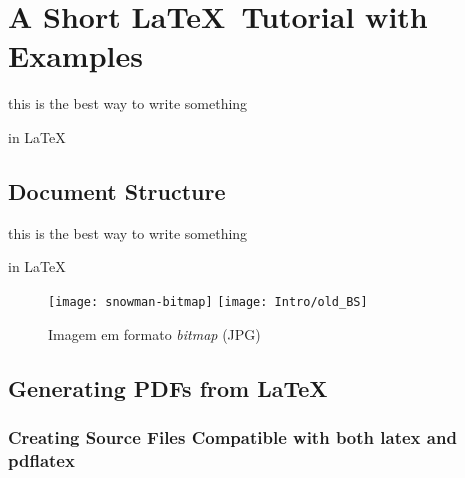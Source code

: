 

\chapter{A Short \LaTeX\ Tutorial with Examples}\label{cha:a_short_latex_tutorial_with_examples}

this is the best way
to write something

in LaTeX


\section{Document Structure}\label{sec:document_structure}

this is the best way
to write something

in LaTeX

\begin{figure}[htbp]
	\centering
	\texttt{[image: snowman-bitmap]}
	\hfill
	\texttt{[image: Intro/old\_BS]}
	\caption{Imagem em formato \emph{bitmap} (JPG)}
	\label{fig:Figuras_Tree_silhouettes-bitmap}
\end{figure}

\section{Generating PDFs from \LaTeX}\label{sec:generating_pdfs_from_latex}

\subsection{Creating Source Files Compatible with both latex and pdflatex}\label{ssec:creating_source_files_compatible_with_both_latex_and_pdflatex}

